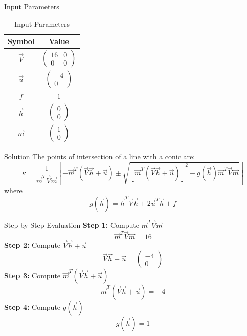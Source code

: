 \documentclass{beamer}
\begin{document}
\begin{frame}{Input Parameters}
\begin{table}[h]
\centering
\begin{tabular}{|c|c|}
\hline
\textbf{Symbol} & \textbf{Value} \\
\hline
$\vec{V}$ & $\begin{pmatrix} 16 & 0 \\ 0 & 0 \end{pmatrix}$ \\
\hline
$\vec{u}$ & $\begin{pmatrix} -4 \\ 0 \end{pmatrix}$ \\
\hline
$f$ & $1$ \\
\hline
$\vec{h}$ & $\begin{pmatrix} 0 \\ 0 \end{pmatrix}$ \\
\hline
$\vec{m}$ & $\begin{pmatrix} 1 \\ 0 \end{pmatrix}$ \\
\hline
\end{tabular}
\caption{Input Parameters}
\end{table}
\end{frame}

\begin{frame}{Solution}
The points of intersection of a line with a conic are:
\[
  \kappa = \frac{1}{\vec{m}^T\vec{V}\vec{m}}
  \left[
    -\vec{m}^T(\vec{V}\vec{h}+\vec{u}) \pm 
    \sqrt{
      \left[\vec{m}^T(\vec{V}\vec{h}+\vec{u})\right]^2
      - g(\vec{h})\vec{m}^T\vec{V}\vec{m}
    }
  \right]
\]
where
\[
  g(\vec{h}) = \vec{h}^T\vec{V}\vec{h} + 2\vec{u}^T\vec{h} + f
\]
\end{frame}

\begin{frame}{Step-by-Step Evaluation}
\textbf{Step 1:} Compute $\vec{m}^T\vec{V}\vec{m}$
\[
  \vec{m}^T\vec{V}\vec{m} = 16
\]
\textbf{Step 2:} Compute $\vec{V}\vec{h} + \vec{u}$
\[
  \vec{V}\vec{h} + \vec{u} = \begin{pmatrix} -4 \\ 0 \end{pmatrix}
\]
\textbf{Step 3:} Compute $\vec{m}^T(\vec{V}\vec{h}+\vec{u})$
\[
  \vec{m}^T(\vec{V}\vec{h}+\vec{u}) = -4
\]
\textbf{Step 4:} Compute $g(\vec{h})$
\[
  g(\vec{h}) = 1
\]
\end{frame}
\end{document}
